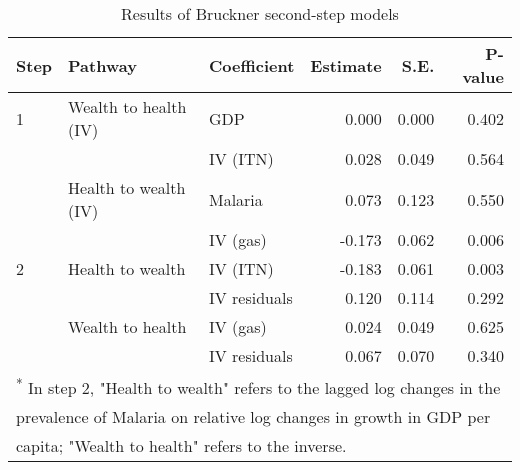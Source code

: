 \begin{table}

\caption{\label{tab:}Results of Bruckner second-step models}
\centering
\begin{tabular}[t]{lllrrr}
\toprule
Step & Pathway & Coefficient & Estimate & S.E. & P-value\\
\midrule
1 & Wealth to health (IV) & GDP & 0.000 & 0.000 & 0.402\\
 &  & IV (ITN) & 0.028 & 0.049 & 0.564\\
 & Health to wealth (IV) & Malaria & 0.073 & 0.123 & 0.550\\
 &  & IV (gas) & -0.173 & 0.062 & 0.006\\
2 & Health to wealth & IV (ITN) & -0.183 & 0.061 & 0.003\\
 &  & IV residuals & 0.120 & 0.114 & 0.292\\
 & Wealth to health & IV (gas) & 0.024 & 0.049 & 0.625\\
 &  & IV residuals & 0.067 & 0.070 & 0.340\\
\bottomrule
\multicolumn{6}{l}{\textsuperscript{*} In step 2, "Health to wealth" refers to the lagged log changes in the}\\
\multicolumn{6}{l}{prevalence of Malaria on relative log changes in growth in GDP per}\\
\multicolumn{6}{l}{capita; "Wealth to health" refers to the inverse.}\\
\end{tabular}
\end{table}